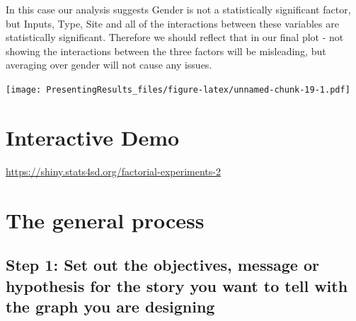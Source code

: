 \documentclass[
  titlepage]{book}
\begin{document}
In this case our analysis suggests Gender is not a statistically significant factor, but Inputs, Type, Site and all of the interactions between these variables are statistically significant. Therefore we should reflect that in our final plot - not showing the interactions between the three factors will be misleading, but averaging over gender will not cause any issues.

\texttt{[image: PresentingResults\_files/figure-latex/unnamed-chunk-19-1.pdf]}

\hypertarget{interactive-demo}{%
\section{Interactive Demo}\label{interactive-demo}}

\label{fig:unnamed-chunk-20}\url{https://shiny.stats4sd.org/factorial-experiments-2}

\hypertarget{the-general-process}{%
\section{The general process}\label{the-general-process}}

\hypertarget{step-1-set-out-the-objectives-message-or-hypothesis-for-the-story-you-want-to-tell-with-the-graph-you-are-designing}{%
\subsection{Step 1: Set out the objectives, message or hypothesis for the story you want to tell with the graph you are designing}\label{step-1-set-out-the-objectives-message-or-hypothesis-for-the-story-you-want-to-tell-with-the-graph-you-are-designing}}
\end{document}
